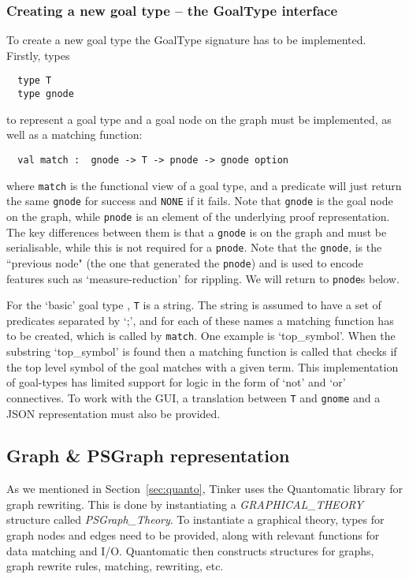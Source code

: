 \documentclass[submission,copyright,creativecommons]{eptcs}
\begin{document}
\subsubsection{Creating a new goal type -- the GoalType interface}

To create a new goal type the GoalType signature has to be implemented. Firstly, types
\begin{verbatim}
  type T
  type gnode
\end{verbatim}
to represent a goal type and a goal node on the graph must be implemented, as well as a matching function:
\begin{verbatim}
  val match :  gnode -> T -> pnode -> gnode option
\end{verbatim}
where \texttt{match} is the functional view of a goal type, and a predicate will just return the same \texttt{gnode} for success and \texttt{NONE} if it fails.
Note that \texttt{gnode} is the goal node on the graph, while \texttt{pnode} is an element of the underlying proof representation. The key differences between them is that a \texttt{gnode} is on the graph and must be serialisable, while this is not required for a \texttt{pnode}. Note that the  \texttt{gnode}, is the ``previous node" (the one that generated the \texttt{pnode}) and is used to encode features such as `measure-reduction' for rippling. We will return to \texttt{pnode}s below.

For the `basic' goal type \cite{LPAR13}, \texttt{T} is a string. The string is assumed to have a set of predicates separated by `;', and for each of these names a matching function has to be created, which is called by \texttt{match}. One example is  `top\_symbol'. When the substring `top\_symbol' is found then a matching function is called that checks if the top level symbol of the goal matches with a given term. This implementation of goal-types has limited support for logic in the form of `not' and `or' connectives. To work with the GUI, a translation between \texttt{T} and \texttt{gnome} and a JSON representation must also be provided.

\subsection{Graph \& PSGraph representation}

As we mentioned in Section~\ref{sec:quanto}, Tinker uses the Quantomatic library for graph rewriting. This is done by instantiating a \textit{GRAPHICAL\_THEORY} structure called \textit{PSGraph\_Theory}. To instantiate a graphical theory, types for graph nodes and edges need to be provided, along with relevant functions for data matching and I/O. Quantomatic then constructs structures for graphs, graph rewrite rules, matching, rewriting, etc.
\end{document}
